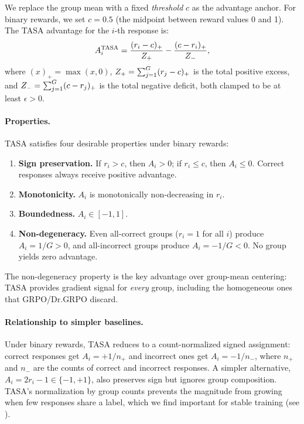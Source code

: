 We replace the group mean with a fixed \emph{threshold} $c$ as the advantage anchor.
For binary rewards, we set $c = 0.5$ (the midpoint between reward values 0 and 1).
The TASA advantage for the $i$-th response is:
\begin{equation}
\label{eq:tasa}
A_i^{\mathrm{TASA}} = \frac{(r_i - c)_+}{Z_{+}} - \frac{(c - r_i)_+}{Z_{-}},
\end{equation}
where $(x)_+ = \max(x, 0)$, $Z_{+} = \sum_{j=1}^G (r_j - c)_+$ is the total positive excess, and $Z_{-} = \sum_{j=1}^G (c - r_j)_+$ is the total negative deficit, both clamped to be at least $\epsilon > 0$.

\paragraph{Properties.}
TASA satisfies four desirable properties under binary rewards:
\begin{enumerate}[leftmargin=*,topsep=2pt,itemsep=1pt]
\item \textbf{Sign preservation.} If $r_i > c$, then $A_i > 0$; if $r_i \leq c$, then $A_i \leq 0$. Correct responses always receive positive advantage.
\item \textbf{Monotonicity.} $A_i$ is monotonically non-decreasing in $r_i$.
\item \textbf{Boundedness.} $A_i \in [-1, 1]$.
\item \textbf{Non-degeneracy.} Even all-correct groups ($r_i = 1$ for all $i$) produce $A_i = 1/G > 0$, and all-incorrect groups produce $A_i = -1/G < 0$. No group yields zero advantage.
\end{enumerate}

The non-degeneracy property is the key advantage over group-mean centering: TASA provides gradient signal for \emph{every} group, including the homogeneous ones that GRPO/Dr.GRPO discard.

\paragraph{Relationship to simpler baselines.}
Under binary rewards, TASA reduces to a count-normalized signed assignment: correct responses get $A_i = +1/n_+$ and incorrect ones get $A_i = -1/n_-$, where $n_+$ and $n_-$ are the counts of correct and incorrect responses.
A simpler alternative, $A_i = 2r_i - 1 \in \{-1, +1\}$, also preserves sign but ignores group composition.
TASA's normalization by group counts prevents the magnitude from growing when few responses share a label, which we find important for stable training (see ).

